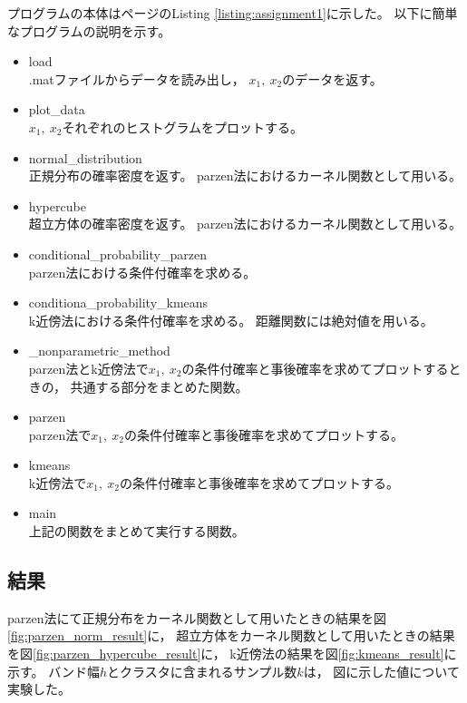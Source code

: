 \documentclass[class=jsarticle, crop=false, dvipdfmx, fleqn]{standalone}
\begin{document}
プログラムの本体は\pageref{listing:assignment1}ページのListing \ref{listing:assignment1}に示した。
以下に簡単なプログラムの説明を示す。

\begin{itemize}
    \item load \\
        .matファイルからデータを読み出し，
        \(x_1,\ x_2\)のデータを返す。
    \item plot\_data \\
        \(x_1,\ x_2\)それぞれのヒストグラムをプロットする。
    \item normal\_distribution \\
        正規分布の確率密度を返す。
        parzen法におけるカーネル関数として用いる。
    \item hypercube \\
        超立方体の確率密度を返す。
        parzen法におけるカーネル関数として用いる。
    \item conditional\_probability\_parzen \\
        parzen法における条件付確率を求める。
    \item conditiona\_probability\_kmeans \\
        k近傍法における条件付確率を求める。
        距離関数には絶対値を用いる。
    \item \_nonparametric\_method \\
        parzen法とk近傍法で\(x_1,\ x_2\)の条件付確率と事後確率を求めてプロットするときの，
        共通する部分をまとめた関数。
    \item parzen \\
        parzen法で\(x_1,\ x_2\)の条件付確率と事後確率を求めてプロットする。
    \item kmeans \\
        k近傍法で\(x_1,\ x_2\)の条件付確率と事後確率を求めてプロットする。
    \item main \\
        上記の関数をまとめて実行する関数。
\end{itemize}



\subsection*{結果}

parzen法にて正規分布をカーネル関数として用いたときの結果を図\ref{fig:parzen_norm_result}に，
超立方体をカーネル関数として用いたときの結果を図\ref{fig:parzen_hypercube_result}に，
k近傍法の結果を図\ref{fig:kmeans_result}に示す。
バンド幅\(h\)とクラスタに含まれるサンプル数\(k\)は，
図に示した値について実験した。
\end{document}
